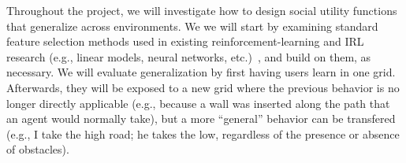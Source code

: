 Throughout the project, we will investigate how to design social
utility functions that generalize across environments. We we will
start by examining standard feature selection methods used in existing
reinforcement-learning and IRL research (e.g., linear models, neural
networks,
etc.)~\cite{diuk2009adaptive,kolter2009regularization,li2009reinforcement,parr2008analysis},
and build on them, as necessary.
We will evaluate generalization by first having users learn in one
grid. Afterwards, they will be exposed to a new grid where the
previous behavior is no longer directly applicable (e.g., because a
wall was inserted along the path that an agent would normally take),
but a more ``general'' behavior can be transfered (e.g., I take the
high road; he takes the low, regardless of the presence or absence of
obstacles).


